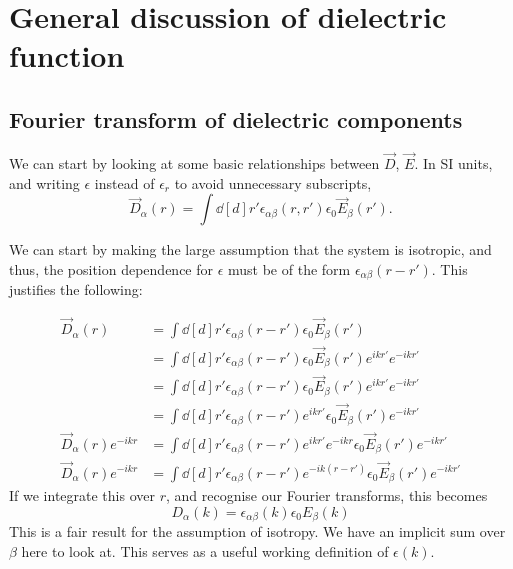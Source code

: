 \documentclass[../../main.tex]{subfiles}
\begin{document}
\section{General discussion of dielectric function}

\subsection{Fourier transform of dielectric components}
We can start by looking at some basic relationships between $\vec{D}$, $\vec{E}$. In SI units, and writing $\epsilon$ instead of $\epsilon_r$ to avoid unnecessary subscripts,
\begin{equation}
	\vec{D}_\alpha(r) = \int \dd[d]{r'} \epsilon_{\alpha\beta}(r, r') \epsilon_0 \vec{E}_\beta(r').
\end{equation}

We can start by making the large assumption that the system is isotropic, and thus, the position dependence for $\epsilon$ must be of the form $\epsilon_{\alpha \beta}(r - r')$. This justifies the following:

\begin{align}
	\vec{D}_\alpha(r) &= \int \dd[d]{r'} \epsilon_{\alpha\beta}(r - r') \epsilon_0 \vec{E}_\beta(r')\\
	&= \int \dd[d]{r'} \epsilon_{\alpha\beta}(r - r') \epsilon_0 \vec{E}_\beta(r') e^{i k r'} e^{-i k r'}\\
	&= \int \dd[d]{r'} \epsilon_{\alpha\beta}(r - r') \epsilon_0 \vec{E}_\beta(r') e^{i k r'} e^{-i k r'} \\
	&= \int \dd[d]{r'} \epsilon_{\alpha\beta}(r - r') e^{i k r'} \epsilon_0 \vec{E}_\beta(r')  e^{-i k r'} \\
	\vec{D}_\alpha(r) e^{-i k r} &= \int \dd[d]{r'} \epsilon_{\alpha\beta}(r - r') e^{i k r'}  e^{-i k r} \epsilon_0 \vec{E}_\beta(r')  e^{-i k r'} \\
	\vec{D}_\alpha(r) e^{-i k r} &= \int \dd[d]{r'} \epsilon_{\alpha\beta}(r - r') e^{-ik(r - r')} \epsilon_0 \vec{E}_\beta(r')  e^{-i k r'}
\end{align}
If we integrate this over $r$, and recognise our Fourier transforms, this becomes
\begin{equation}
	D_\alpha(k) = \epsilon_{\alpha \beta}(k) \epsilon_0 E_\beta(k) \label{eq:DerivingThomasFermi:epsilonDef}
\end{equation}
This is a fair result for the assumption of isotropy. We have an implicit sum over $\beta$ here to look at. This serves as a useful working definition of $\epsilon(k)$.
\end{document}
